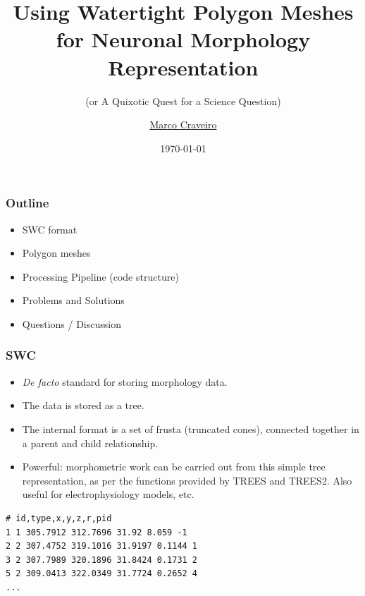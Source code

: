 \documentclass{beamer}
\title{Using Watertight Polygon Meshes for Neuronal Morphology Representation}
\subtitle{(or A Quixotic Quest for a Science Question)}
\author{
  \texorpdfstring
      {\href{mailto:marco.craveiro@gmail.com}{Marco Craveiro}}
      {Marco Craveiro}
}
\date{\today}
\begin{document}
\begin{frame}
\titlepage
\end{frame}

\begin{frame}
\frametitle{Outline}
\begin{itemize}
\item SWC format
\pause
\item Polygon meshes
\pause
\item Processing Pipeline (code structure)
\pause
\item Problems and Solutions
\pause

\item Questions / Discussion
\end{itemize}
\end{frame}

\begin{frame}[fragile]
\frametitle{SWC}

\begin{itemize}

\item \emph{De facto} standard for storing morphology data.
\pause
\item The data is stored as a tree.
\pause
\item The internal format is a set of frusta (truncated cones),
  connected together in a parent and child relationship.
\pause
\item Powerful: morphometric work can be carried out from this simple
  tree representation, as per the functions provided by TREES and
  TREES2. Also useful for electrophysiology models, etc.
\pause
\end{itemize}

\begin{verbatim}
# id,type,x,y,z,r,pid
1 1 305.7912 312.7696 31.92 8.059 -1
2 2 307.4752 319.1016 31.9197 0.1144 1
3 2 307.7989 320.1896 31.8424 0.1731 2
5 2 309.0413 322.0349 31.7724 0.2652 4
...
\end{verbatim}
\end{frame}
\end{document}
